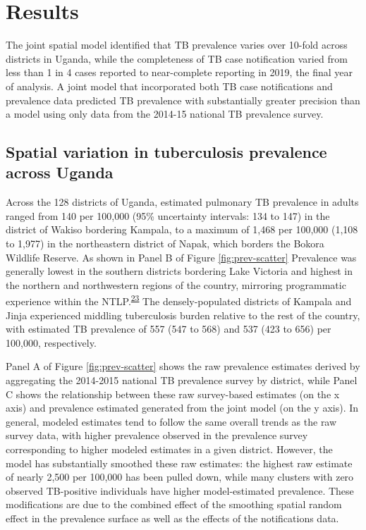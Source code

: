 \documentclass[
]{article}
\begin{document}
\hypertarget{results}{%
\section{Results}\label{results}}

The joint spatial model identified that TB prevalence varies over 10-fold across districts in Uganda, while the completeness of TB case notification varied from less than 1 in 4 cases reported to near-complete reporting in 2019, the final year of analysis. A joint model that incorporated both TB case notifications and prevalence data predicted TB prevalence with substantially greater precision than a model using only data from the 2014-15 national TB prevalence survey.

\hypertarget{spatial-variation-in-tuberculosis-prevalence-across-uganda}{%
\subsection{Spatial variation in tuberculosis prevalence across Uganda}\label{spatial-variation-in-tuberculosis-prevalence-across-uganda}}

Across the 128 districts of Uganda, estimated pulmonary TB prevalence in adults ranged from 140 per 100,000 (95\% uncertainty intervals: 134 to 147) in the district of Wakiso bordering Kampala, to a maximum of 1,468 per 100,000 (1,108 to 1,977) in the northeastern district of Napak, which borders the Bokora Wildlife Reserve. As shown in Panel B of Figure \ref{fig:prev-scatter} Prevalence was generally lowest in the southern districts bordering Lake Victoria and highest in the northern and northwestern regions of the country, mirroring programmatic experience within the NTLP.\textsuperscript{\protect\hyperlink{ref-UgandaNationalTuberculosisandLeprosyProgramme2020a}{23}} The densely-populated districts of Kampala and Jinja experienced middling tuberculosis burden relative to the rest of the country, with estimated TB prevalence of 557 (547 to 568) and 537 (423 to 656) per 100,000, respectively.

Panel A of Figure \ref{fig:prev-scatter} shows the raw prevalence estimates derived by aggregating the 2014-2015 national TB prevalence survey by district, while Panel C shows the relationship between these raw survey-based estimates (on the x axis) and prevalence estimated generated from the joint model (on the y axis). In general, modeled estimates tend to follow the same overall trends as the raw survey data, with higher prevalence observed in the prevalence survey corresponding to higher modeled estimates in a given district. However, the model has substantially smoothed these raw estimates: the highest raw estimate of nearly 2,500 per 100,000 has been pulled down, while many clusters with zero observed TB-positive individuals have higher model-estimated prevalence. These modifications are due to the combined effect of the smoothing spatial random effect in the prevalence surface as well as the effects of the notifications data.
\end{document}
